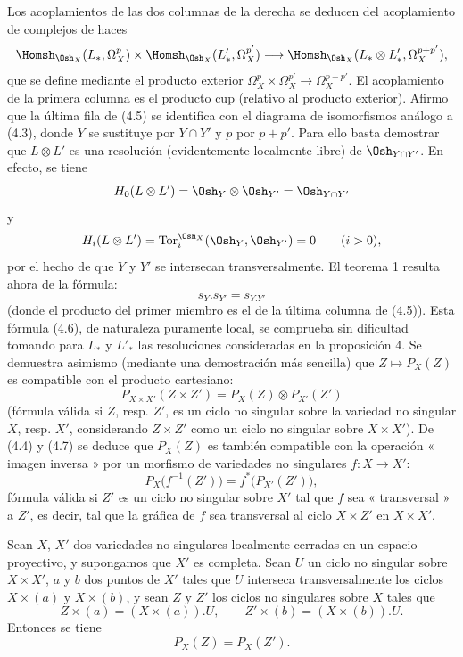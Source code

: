 Los acoplamientos de las dos columnas de la derecha se deducen del acoplamiento de
complejos de haces
\[
\Homsh_{\Osh_X}(L_{*},\Omega_X^{p})
\times\Homsh_{\Osh_X}(L'_{*},\Omega_X^{p'})
\longrightarrow
\Homsh_{\Osh_X}(L_{*}\otimes L'_{*},\Omega_X^{p+p'}),
\]
que se define mediante el producto exterior
$\Omega_X^{p}\times\Omega_X^{p'}\longrightarrow\Omega_X^{p+p'}$.
El acoplamiento de la primera columna es el producto cup (relativo al producto
exterior). Afirmo que la última fila de (4.5) se identifica con el diagrama
de isomorfismos análogo a (4.3), donde $Y$ se sustituye por $Y\cap Y'$ y $p$ por
$p+p'$. Para ello basta demostrar que $L\otimes L'$ es una resolución
(evidentemente localmente libre) de $\Osh_{Y\cap Y'}$. En efecto, se tiene
\[
  H_0(L\otimes L')=\Osh_Y\otimes\Osh_{Y'}=\Osh_{Y\cap Y'}
\]
y
\[
  H_i(L\otimes L')=\operatorname{Tor}_{i}^{\Osh_X}(\Osh_Y,\Osh_{Y'})=0
  \qquad(i>0),
\]
por el hecho de que $Y$ y $Y'$ se intersecan transversalmente. El teorema 1 resulta
ahora de la fórmula:
\begin{equation}\tag{4.6}
  s_Y.s_{Y'}=s_{Y.Y'}
\end{equation}
(donde el producto del primer miembro es el de la última columna de (4.5)).
Esta fórmula (4.6), de naturaleza puramente local, se comprueba sin dificultad
tomando para $L_{*}$ y $L'_{*}$ las resoluciones consideradas en la proposición
4. Se demuestra asimismo (mediante una demostración más sencilla) que
$Z\longmapsto P_X(Z)$ es compatible con el producto cartesiano:
\begin{equation}\tag{4.7}
  P_{X\times X'}(Z\times Z')=P_X(Z)\otimes P_{X'}(Z')
\end{equation}
(fórmula válida si $Z$, resp. $Z'$, es un ciclo no singular sobre la variedad
no singular $X$, resp. $X'$, considerando $Z\times Z'$ como un ciclo no
singular sobre $X\times X'$). De (4.4) y (4.7) se deduce que $P_X(Z)$ es también
compatible con la operación « imagen inversa » por un morfismo de variedades no
singulares $f:X\longrightarrow X'$:
\begin{equation}\tag{4.8}
  P_X\bigl(f^{-1}(Z')\bigr)=f^{*}\bigl(P_{X'}(Z')\bigr),
\end{equation}
fórmula válida si $Z'$ es un ciclo no singular sobre $X'$ tal que $f$ sea
« transversal » a $Z'$, es decir, tal que la gráfica de $f$ sea transversal al ciclo
$X\times Z'$ en $X\times X'$.

 Sean $X$, $X'$ dos variedades no singulares
localmente cerradas en un espacio proyectivo, y supongamos que $X'$ es completa. Sean $U$
un ciclo no singular sobre $X\times X'$, $a$ y $b$ dos puntos de $X'$ tales que
$U$ interseca transversalmente los ciclos $X\times(a)$ y $X\times(b)$, y sean $Z$
y $Z'$ los ciclos no singulares sobre $X$ tales que
\[
  Z\times(a)=(X\times(a)).U,
  \qquad
  Z'\times(b)=(X\times(b)).U.
\]
Entonces se tiene
\[
  P_X(Z)=P_X(Z').
\]

